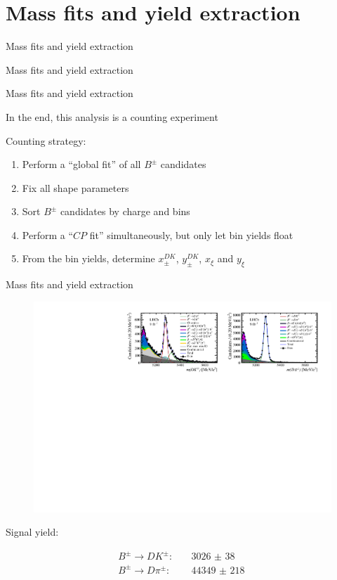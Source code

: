 \documentclass{beamer}
\begin{document}
\section{Mass fits and yield extraction}
\begin{frame}{Mass fits and yield extraction}
  \begin{center}
    {\huge Mass fits and yield extraction}
  \end{center}
\end{frame}

\begin{frame}{Mass fits and yield extraction}
  \begin{center}
    \large In the end, this analysis is a counting experiment
  \end{center}
  Counting strategy:
  \begin{enumerate}
    \setlength\itemsep{1.0em}
    \item{Perform a ``global fit'' of all $B^\pm$ candidates}
    \item{Fix all shape parameters}
    \item{Sort $B^\pm$ candidates by charge and bins}
    \item{Perform a ``$C\!P$ fit'' simultaneously, but only let bin yields float}
    \item{From the bin yields, determine $x_\pm^{DK}$, $y_\pm^{DK}$, $x_\xi$ and $y_\xi$}
  \end{enumerate}
\end{frame}

\begin{frame}{Mass fits and yield extraction}
  \begin{figure}
    \centering
    \includegraphics[width = 1.0\textwidth]{Plots/d2kkpipi_fiveL_allDP.pdf}
  \end{figure}
  \begin{center}
    Signal yield:
  \end{center}
  \vspace{-0.3cm}
  \begin{align*}
    B^\pm\to DK^\pm:&\quad \SI{3026(38)}{} \\
    B^\pm\to D\pi^\pm:&\quad \SI{44349(218)}{}
  \end{align*}
\end{frame}
\end{document}

